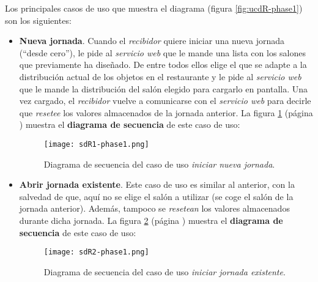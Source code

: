 Los principales casos de uso que muestra el diagrama (figura
\ref{fig:ucdR-phase1}) son los siguientes:
\begin{itemize}
\item \textbf{Nueva jornada}. Cuando el \emph{recibidor} quiere iniciar una
nueva jornada (``desde cero''), le pide al \emph{servicio web} que le mande 
una lista con los salones que previamente ha diseñado. De entre todos ellos
elige el que se adapte a la distribución actual de los objetos en el
restaurante y le pide al \emph{servicio web} que le mande la distribución del
salón elegido para cargarlo en pantalla. Una vez cargado, el \emph{recibidor}
vuelve a comunicarse con el \emph{servicio web} para decirle que \emph{resetee}
los valores almacenados de la jornada anterior. La figura \ref{fig:sdR1-phase1}
(página \pageref{fig:sdR1-phase1}) muestra el \textbf{diagrama de secuencia} de 
este caso de uso:

  \begin{figure}[!h]
    \begin{center}
      \texttt{[image: sdR1-phase1.png]}
      \caption{Diagrama de secuencia del caso de uso \emph{iniciar nueva
      jornada}.}
      \label{fig:sdR1-phase1}
    \end{center}
  \end{figure}

\item \textbf{Abrir jornada existente}. Este caso de uso es similar al
anterior, con la salvedad de que, aquí no se elige el salón a
utilizar (se coge el salón de la jornada anterior). Además, tampoco se
\emph{resetean} los valores almacenados durante dicha jornada. La figura
\ref{fig:sdR2-phase1} (página \pageref{fig:sdR2-phase1}) muestra el
\textbf{diagrama de secuencia} de este caso de uso:

  \begin{figure}[!h]
    \begin{center}
      \texttt{[image: sdR2-phase1.png]}
      \caption{Diagrama de secuencia del caso de uso \emph{iniciar jornada
      existente}.}
      \label{fig:sdR2-phase1}
    \end{center}
  \end{figure}


\end{itemize}
